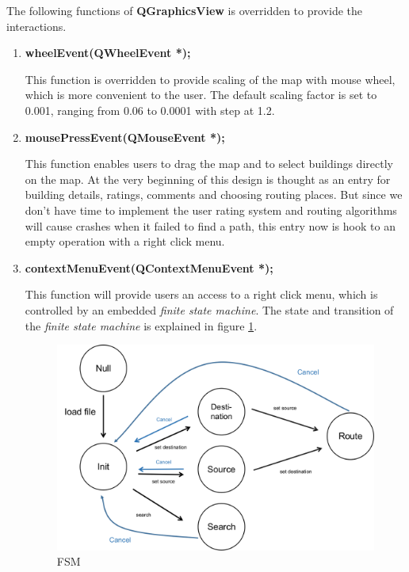 \documentclass[a4paper, 12pt, english]{book}
\begin{document}
The following functions of {\textbf{QGraphicsView}} is overridden to provide the interactions.
\begin{enumerate}
	\item {\textbf{wheelEvent(QWheelEvent *);}}
	
	This function is overridden to provide scaling of the map with mouse wheel, which is more convenient to the user. The default scaling factor is set to 0.001, ranging from 0.06 to 0.0001 with step at 1.2.	
	\item {\textbf{mousePressEvent(QMouseEvent *);}}
	
	This function enables users to drag the map and to select buildings directly on the map. At the very beginning of this design is thought as an entry for building details, ratings, comments and choosing routing places. But since we don't have time to implement the user rating system and routing algorithms will cause crashes when it failed to find a path, this entry now is hook to an empty operation with a right click menu. 
	
	\item {\textbf{contextMenuEvent(QContextMenuEvent *);}}
	
	This function will provide users an access to a right click menu, which is controlled by an embedded {\textit{finite state machine}}. The state and transition of the {\textit{finite state machine}} is explained in figure \ref{fig:FSM}.
	\begin{figure}[h!]
		\centering
		\includegraphics[width=0.7\linewidth]{./img/FSM.png}
		\caption{FSM}
		\label{fig:FSM}
	\end{figure}


\end{enumerate}
\end{document}
